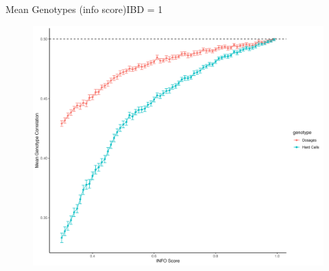 \documentclass{beamer}
\begin{document}
\begin{frame}{Mean Genotypes (info score)}{IBD = 1}

      \begin{figure}

            \includegraphics[width= .85\textwidth]{fig/mean_gt_by_ibd_1.png}
            
      \end{figure}

\end{frame}


\end{document}
